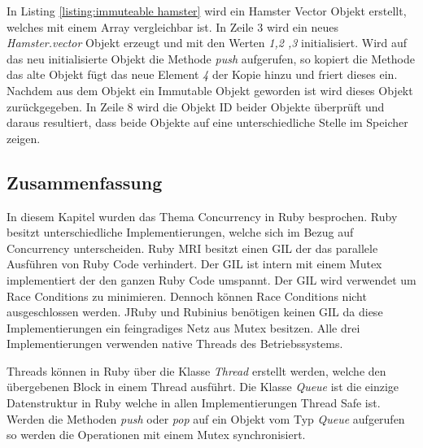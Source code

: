 In Listing \ref{listing:immuteable hamster} wird ein Hamster Vector Objekt erstellt, welches mit einem Array vergleichbar ist. In Zeile 3 wird ein neues \emph{Hamster.vector} Objekt erzeugt und mit den Werten \emph{1,2 ,3} initialisiert. Wird auf das neu initialisierte Objekt die Methode \emph{push} aufgerufen, so kopiert die Methode das alte Objekt fügt das neue Element \emph{4} der Kopie hinzu und friert dieses ein. Nachdem aus dem Objekt ein Immutable Objekt geworden ist wird dieses Objekt zurückgegeben. In Zeile 8 wird die Objekt ID beider Objekte überprüft und daraus resultiert, dass beide Objekte auf eine unterschiedliche Stelle im Speicher zeigen. 

\subsection{Zusammenfassung}
In diesem Kapitel wurden das Thema Concurrency in Ruby besprochen. Ruby besitzt unterschiedliche Implementierungen, welche sich im Bezug auf Concurrency unterscheiden. Ruby MRI besitzt einen GIL der das parallele Ausführen von Ruby Code verhindert. Der GIL ist intern mit einem Mutex implementiert der den ganzen Ruby Code umspannt. Der GIL wird verwendet um Race Conditions zu minimieren. Dennoch können Race Conditions nicht ausgeschlossen werden. JRuby und Rubinius benötigen keinen GIL da diese Implementierungen ein feingradiges Netz aus Mutex besitzen. Alle drei Implementierungen verwenden native Threads des Betriebssystems. 

Threads können in Ruby über die Klasse \emph{Thread} erstellt werden, welche den übergebenen Block in einem Thread ausführt. Die Klasse \emph{Queue} ist die einzige Datenstruktur in Ruby welche in allen Implementierungen Thread Safe ist. Werden die Methoden \emph{push} oder \emph{pop} auf ein Objekt vom Typ \emph{Queue} aufgerufen so werden die Operationen mit einem Mutex synchronisiert.